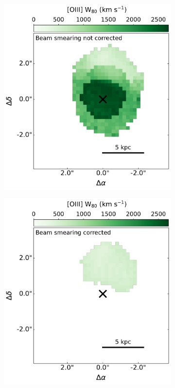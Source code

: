 \begin{figure}
    \centering
    \begin{subfigure}[b]{0.5175\linewidth}        
        \includegraphics[width=\textwidth]{figures/muse_f13451_1232/w80_map_free.pdf}
    \label{fig: muse_f13451_1232: analysis_and_results: extended_emission: w80_map_free}
    \end{subfigure}
    \hfill
    \begin{subfigure}{0.43\linewidth}        
        \includegraphics[width=\linewidth, trim={3.1cm 0 0 0}, clip]{figures/muse_f13451_1232/w80_map_nm.pdf}

\end{subfigure}
\end{figure}
